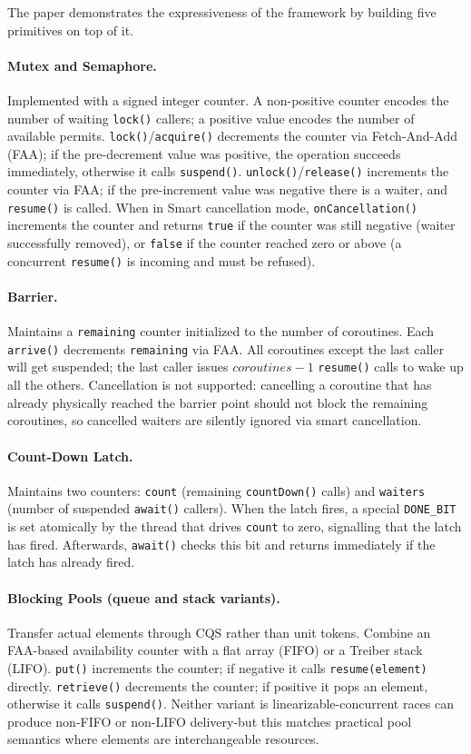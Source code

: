 \documentclass[11pt,a4paper]{article}
\begin{document}
The paper demonstrates the expressiveness of the framework by building
five primitives on top of it.

\paragraph{Mutex and Semaphore.}
Implemented with a signed integer counter. A non-positive counter
encodes the number of waiting \texttt{lock()} callers; a positive value
encodes the number of available permits.
\texttt{lock()}/\texttt{acquire()} decrements the counter via
Fetch-And-Add (FAA); if the pre-decrement value was positive, the
operation succeeds immediately, otherwise it calls \texttt{suspend()}.
\texttt{unlock()}/\texttt{release()} increments the counter via FAA; if
the pre-increment value was negative there is a waiter, and
\texttt{resume()} is called. When in Smart cancellation mode,
\texttt{onCancellation()} increments the counter and returns
\texttt{true} if the counter was still negative (waiter successfully
removed), or \texttt{false} if the counter reached zero or above (a
concurrent \texttt{resume()} is incoming and must be refused).

\paragraph{Barrier.}
Maintains a \texttt{remaining} counter initialized to the number of
coroutines. Each \texttt{arrive()} decrements \texttt{remaining} via
FAA. All coroutines except the last caller will get suspended; the last
caller issues $\textit{coroutines} - 1$ \texttt{resume()} calls to wake
up all the others. Cancellation is not supported: cancelling a coroutine
that has already physically reached the barrier point should not block
the remaining coroutines, so cancelled waiters are silently ignored via
smart cancellation.

\paragraph{Count-Down Latch.}
Maintains two counters: \texttt{count} (remaining \texttt{countDown()}
calls) and \texttt{waiters} (number of suspended \texttt{await()}
callers). When the latch fires, a special \texttt{DONE\_BIT} is set
atomically by the thread that drives \texttt{count} to zero, signalling
that the latch has fired. Afterwards, \texttt{await()} checks this bit
and returns immediately if the latch has already fired.

\paragraph{Blocking Pools (queue and stack variants).}
Transfer actual elements through CQS rather than unit tokens. Combine an
FAA-based availability counter with a flat array (FIFO) or a Treiber
stack (LIFO). \texttt{put()} increments the counter; if negative it
calls \texttt{resume(element)} directly. \texttt{retrieve()} decrements
the counter; if positive it pops an element, otherwise it calls
\texttt{suspend()}. Neither variant is linearizable-concurrent races
can produce non-FIFO or non-LIFO delivery-but this matches practical
pool semantics where elements are interchangeable resources.
\end{document}

